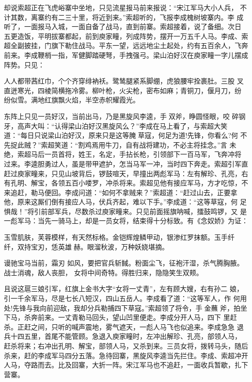 却说索超正在飞虎峪寨中坐地，只见流星报马前来报说：“宋江军马大小人兵，
不计其数，离寨约有二三十里，将近到来。”索超听的，飞报李成槐树坡寨内。李
成听了，一面报马入城，一面自备了战马，直到前寨。索超接着，说了备细。次日
五更造饭，平明拔寨都起，前到庾家疃，列成阵势，摆开一万五千人马。李成、索
超全副披挂，门旗下勒住战马。平东一望，远远地尘土起处，约有五百余人，飞奔
前来。李成鞭梢一指，军健脚踏硬弩，手拽强弓。梁山泊好汉在庾家疃一字儿摆成
阵势。只见：

人人都带茜红巾，个个齐穿绯衲袄。鹭鸶腿紧系脚绷，虎狼腰牢拴裹肚。三股
叉直迸寒光，四棱简横拖冷雾。柳叶枪，火尖枪，密布如麻；青铜刀，偃月刀，纷
纷似雪。满地红旗飘火焰，半空赤帜耀霞光。

东阵上只见一员好汉，当前出马，乃是黑旋风李逵，手双斧，睁圆怪眼，咬
碎钢牙，高声大叫：“认得梁山泊好汉黑旋风么？”李成在马上看了，与索超大笑
道：“每日只说梁山泊好汉，原来只是这等腌草寇，何足为道!先锋，你看么?何
不先捉此贼？”索超笑道：“割鸡焉用牛刀，自有战将建功，不必主将挂念。”言
未绝，索超马后一员首将，姓王，名定，手拈长枪，引领部下一百马军，飞奔冲将
过来。李逵胆勇过人，虽是带甲遮护，怎当马军一冲，当时四下奔走。索超引军直
赶过庾家疃来，只见山坡背后，锣鼓喧天，早撞出两彪军马：左有解珍、孔亮，右
有孔明、解宝，各领五百小喽罗，冲杀将来。索超见他有接应军马，方才吃惊，不
来追赶，勒马便回。李成问道：“如何不拿贼来？”索超道：“赶过山去，正要拿
他，原来这厮们倒有接应人马，伏兵齐起，难以下手。”李成道：“这等草寇，何
足惧哉！”将引前部军兵，尽数杀过庾家疃来。只见前面摇旗呐喊，擂鼓鸣锣，又
是一彪军马：当先一骑马上，却是一员女将，结束得十分标致。有《念奴娇》为证：

玉雪肌肤，芙蓉模样，有天然标格。金铠辉煌鳞甲动，银渗红罗抹额。玉手纤
纤，双持宝刃，恁英雄赫。眼溜秋波，万种妖娆堪摘。

谩驰宝马当前，霜刃
如风，要把官兵斩馘。粉面尘飞，征袍汗湿，杀气腾胸腋。战士消魂，敌人丧胆，
女将中间奇特。得胜归来，隐隐笑生双颊。

且说这扈三娘引军，红旗上金书大字“女将一丈青”，左有顾大嫂，右有孙二
娘，引一千余军马，尽是七长八短汉，四山五岳人。李成看了道：“这等军人，作
何用处!先锋与我向前迎敌，我却分兵勒捕四下草寇。”索超领了将令，手金蘸
斧，拍坐下马，杀奔前来。一丈青勒马回头，望山凹里便走。李成分开人马，四下
里赶杀。正赶之间，只听的喊声震地，雾气遮天，一彪人马飞也似追来。李成急急
退兵十四五里，首尾不能管顾。急退入庾家疃时，左冲出解珍、孔亮，部领人马，
赶杀将来；右冲出孔明、解宝，部领人马，又杀到来。三员女将，拨转马头，随后
杀来，赶的李成军马四分五落。急待回寨，黑旋风李逵当先拦住。李成、索超冲开
人马，夺路而去。比及回寨，大折一阵。宋江军马也不追赶，一面收兵暂歇，扎下
营寨。

